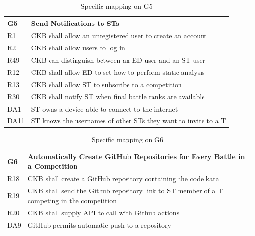   \begin{table}[H]
    \begin{longtable}{|l|p{12cm}|}
      \hline
      \textbf{G5} & \textbf{Send Notifications to STs}      \\
      \hline
      R1 & CKB shall allow an unregistered user to create an account \\
      \hline
      R2 & CKB shall allow users to log in \\
      \hline
      R49 & CKB can distinguish between an ED user and an ST user \\
      \hline
      R12 & CKB shall allow ED to set how to perform static analysis \\
      \hline
      R13 & CKB shall allow ST to subscribe to a competition \\
      \hline
      R30 & CKB shall notify ST when final battle ranks are available \\
      \hline
      DA1 & ST owns a device able to connect to the internet \\
      \hline
      DA11 & ST knows the usernames of other STs they want to invite to a T \\
      \hline
    \end{longtable}
    \caption{Specific mapping on G5}
    \label{tab:mappingG5}
  \end{table}

  \begin{table}[H]
    \begin{longtable}{|l|p{12cm}|}
      \hline
      \textbf{G6} & \textbf{Automatically Create GitHub Repositories for Every Battle in a Competition}      \\
      \hline
      R18 & CKB shall create a GitHub repository containing the code kata \\
      \hline
      R19 & CKB shall send the Github repository link to ST member of a T competing in the competition \\
      \hline
      R20 & CKB shall supply API to call with Github actions \\
      \hline
      DA9 & GitHub permits automatic push to a repository \\
      \hline
    \end{longtable}
    \caption{Specific mapping on G6}
    \label{tab:mappingG6}
  \end{table}


